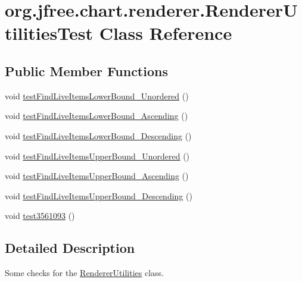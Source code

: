 \hypertarget{classorg_1_1jfree_1_1chart_1_1renderer_1_1_renderer_utilities_test}{}\section{org.\+jfree.\+chart.\+renderer.\+Renderer\+Utilities\+Test Class Reference}
\label{classorg_1_1jfree_1_1chart_1_1renderer_1_1_renderer_utilities_test}
\subsection*{Public Member Functions}
\begin{DoxyCompactItemize}
\item 
void \mbox{\hyperlink{classorg_1_1jfree_1_1chart_1_1renderer_1_1_renderer_utilities_test_a58f2521c4319aefa32260af7cc43962f}{test\+Find\+Live\+Items\+Lower\+Bound\+\_\+\+Unordered}} ()
\item 
void \mbox{\hyperlink{classorg_1_1jfree_1_1chart_1_1renderer_1_1_renderer_utilities_test_a5973f08efd82624501f272cbce54e491}{test\+Find\+Live\+Items\+Lower\+Bound\+\_\+\+Ascending}} ()
\item 
void \mbox{\hyperlink{classorg_1_1jfree_1_1chart_1_1renderer_1_1_renderer_utilities_test_a30c258091e15c2688462b6cd0a7e01c7}{test\+Find\+Live\+Items\+Lower\+Bound\+\_\+\+Descending}} ()
\item 
void \mbox{\hyperlink{classorg_1_1jfree_1_1chart_1_1renderer_1_1_renderer_utilities_test_afe7c9647e7a5d503f94564a204c0a10a}{test\+Find\+Live\+Items\+Upper\+Bound\+\_\+\+Unordered}} ()
\item 
void \mbox{\hyperlink{classorg_1_1jfree_1_1chart_1_1renderer_1_1_renderer_utilities_test_a0309e27145db960ea843337abed3b947}{test\+Find\+Live\+Items\+Upper\+Bound\+\_\+\+Ascending}} ()
\item 
void \mbox{\hyperlink{classorg_1_1jfree_1_1chart_1_1renderer_1_1_renderer_utilities_test_ac6c467a171d4261ad62259b598c19ea2}{test\+Find\+Live\+Items\+Upper\+Bound\+\_\+\+Descending}} ()
\item 
void \mbox{\hyperlink{classorg_1_1jfree_1_1chart_1_1renderer_1_1_renderer_utilities_test_a0f700296d35b5e00f20b53a0b3ea3a8a}{test3561093}} ()
\end{DoxyCompactItemize}


\subsection{Detailed Description}
Some checks for the \mbox{\hyperlink{classorg_1_1jfree_1_1chart_1_1renderer_1_1_renderer_utilities}{Renderer\+Utilities}} class. 

